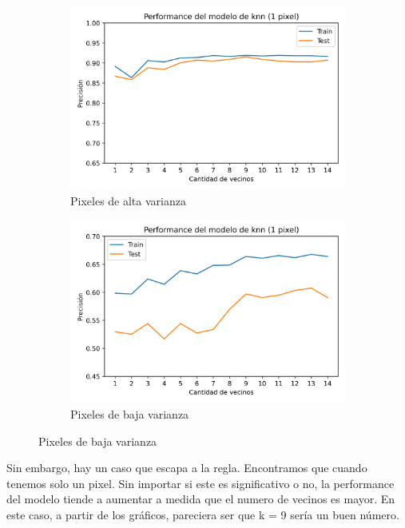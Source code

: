 \documentclass[10pt,a4paper]{article}
\begin{document}
\newpage

\begin{figure}[ht!]
	\begin{subfigure}{0.5\textwidth}
		\includegraphics[width=0.9\linewidth]{imagenes/1pixelalto.png} 
		\caption{Pixeles de alta varianza}
		\label{fig:subfig1}
	\end{subfigure}
	\begin{subfigure}{0.5\textwidth}
		\includegraphics[width=0.9\linewidth]{Imagenes/1pixelbajo.png}
		\caption{Pixeles de baja varianza}
		\label{fig:subfig2}
	\end{subfigure}
	\label{fig:subfigs}
\end{figure}


Sin embargo, hay un caso que escapa a la regla. Encontramos que cuando tenemos solo un pixel. Sin importar si este es significativo o no, la performance del modelo tiende a aumentar a medida que el numero de vecinos es mayor. En este caso, a partir de los gráficos, pareciera ser que k = 9 sería un buen número.
\end{document}
